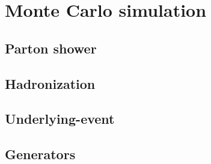 \clearpage{\pagestyle{empty}\cleardoublepage}

\chapter{Monte Carlo simulation}\label{chap:mc}


\section{Parton shower}\label{sec:partonshower}

\section{Hadronization}\label{sec:hadronization}

\section{Underlying-event}\label{sec:underlyingevent}

\section{Generators}\label{sec:generators}

